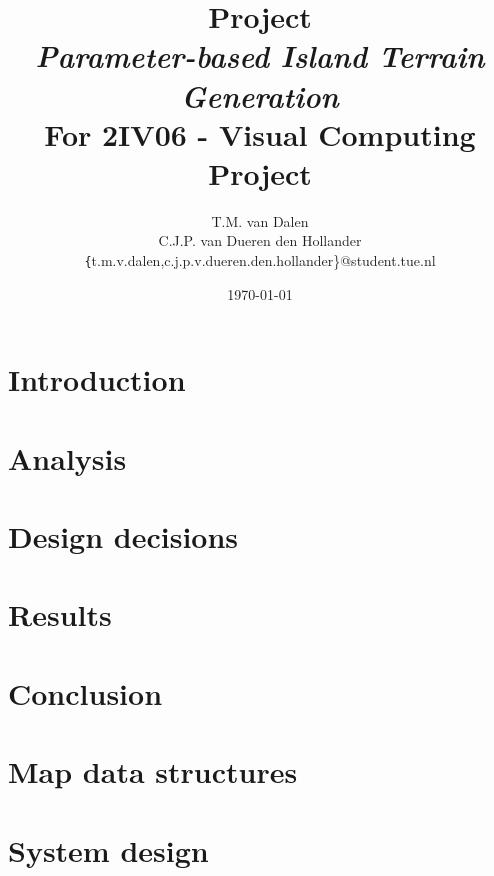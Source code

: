 \documentclass[11pt,a4paper,twocolumn]{article}
\title{
	{\huge Project\\ \emph{Parameter-based Island Terrain Generation}}\\
	{\large For 2IV06 - Visual Computing Project}
}
\author{
	T.M. van Dalen \\
	C.J.P. van Dueren den Hollander\\
	{\texttt\{t.m.v.dalen,c.j.p.v.dueren.den.hollander\}}@student.tue.nl
}
\date{\today}
\begin{document}
	\maketitle
	
	
	
	\section{Introduction}
	\label{sec:intro}
	
	
	\section{Analysis}
	\label{sec:analysis}
	
	
	\section{Design decisions}
	\label{sec:choices}
	
	
	
	\section{Results}
	\label{sec:results}
	
	
	\section{Conclusion}
	\label{sec:conclusion}
	

	\begin{appendices}
	\section{Map data structures}
	\label{appendix:mapdatastructures}
	

	\section{System design}
	\label{appendix:system}
	
	\end {appendices}

	
	
\end{document}
